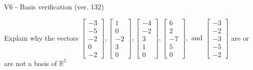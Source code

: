 \begin{exercise}
  \begin{exerciseTitle}V6 - Basis verification (ver. 132)\end{exerciseTitle}
  \begin{exerciseStatement}
    Explain why the vectors \(\left[\begin{array}{r}
-3 \\
-5 \\
-2 \\
0 \\
-2
\end{array}\right] , \left[\begin{array}{r}
1 \\
0 \\
-2 \\
3 \\
0
\end{array}\right] , \left[\begin{array}{r}
-4 \\
-2 \\
3 \\
1 \\
0
\end{array}\right] , \left[\begin{array}{r}
6 \\
2 \\
-7 \\
5 \\
0
\end{array}\right] , \text{ and } \left[\begin{array}{r}
-3 \\
-2 \\
-3 \\
-5 \\
-2
\end{array}\right]\) are or are not a basis of \(\mathbb{R}^5\)	



\end{exerciseStatement}
\end{exercise}
